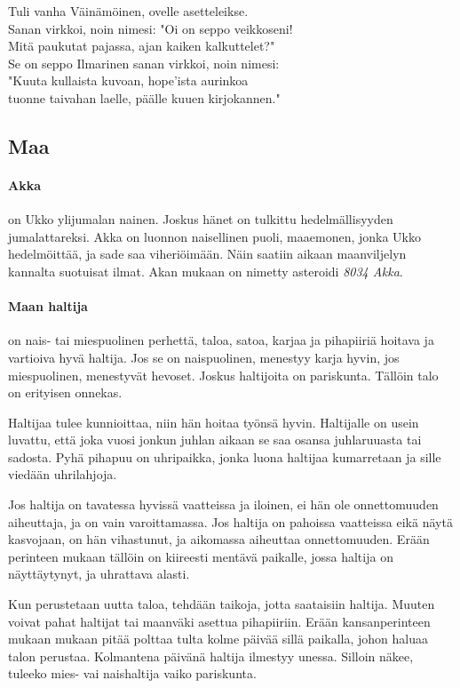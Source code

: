   \begin{center}\begin{em}
    Tuli vanha Väinämöinen, ovelle asetteleikse.\\
    Sanan virkkoi, noin nimesi: "Oi on seppo veikkoseni!\\
    Mitä paukutat pajassa, ajan kaiken kalkuttelet?"\\
    Se on seppo Ilmarinen sanan virkkoi, noin nimesi:\\
    "Kuuta kullaista kuvoan, hope'ista aurinkoa\\
    tuonne taivahan laelle, päälle kuuen kirjokannen."\\
  \end{em}\end{center}


\subsection{Maa}

  \paragraph{Akka} on Ukko ylijumalan nainen. Joskus hänet on tulkittu hedelmällisyyden
    jumalattareksi. Akka on luonnon naisellinen puoli, maaemonen, jonka Ukko hedelmöittää,
    ja sade saa viheriöimään. Näin saatiin aikaan maanviljelyn kannalta suotuisat ilmat.
    Akan mukaan on nimetty asteroidi \emph{8034 Akka}.
  \paragraph{Maan haltija} on nais- tai miespuolinen perhettä, taloa, satoa, karjaa ja pihapiiriä
    hoitava ja vartioiva hyvä haltija. Jos se on naispuolinen, menestyy karja hyvin, jos
    miespuolinen, menestyvät hevoset. Joskus haltijoita on pariskunta. Tällöin talo on erityisen
    onnekas. \par
    Haltijaa tulee kunnioittaa, niin hän hoitaa työnsä hyvin. Haltijalle on usein luvattu, että
    joka vuosi jonkun juhlan aikaan se saa osansa juhlaruuasta tai sadosta. Pyhä pihapuu on
    uhripaikka, jonka luona haltijaa kumarretaan ja sille viedään uhrilahjoja. \par
    Jos haltija on tavatessa hyvissä vaatteissa ja iloinen, ei hän ole onnettomuuden aiheuttaja,
    ja on vain varoittamassa. Jos haltija on pahoissa vaatteissa eikä näytä kasvojaan, on hän
    vihastunut, ja aikomassa aiheuttaa onnettomuuden. Erään perinteen mukaan tällöin on kiireesti
    mentävä paikalle, jossa haltija on näyttäytynyt, ja uhrattava alasti. \par
    Kun perustetaan uutta taloa, tehdään taikoja, jotta saataisiin haltija. Muuten voivat pahat
    haltijat tai maanväki asettua pihapiiriin. Erään kansanperinteen mukaan mukaan pitää polttaa
    tulta kolme päivää sillä paikalla, johon haluaa talon perustaa. Kolmantena päivänä haltija
    ilmestyy unessa. Silloin näkee, tuleeko mies- vai naishaltija vaiko pariskunta.

